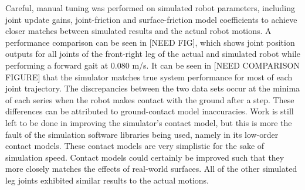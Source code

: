 		Careful, manual tuning was performed on simulated robot parameters, including joint update gains, joint-friction and surface-friction model coefficients to achieve closer matches between simulated results and the actual robot motions. A performance comparison can be seen in [NEED FIG], which shows joint position outputs for all joints of the front-right leg of the actual and simulated robot while performing a forward gait at $0.080$ m/s. It can be seen in [NEED COMPARISON FIGURE] that the simulator matches true system performance for most of each joint trajectory. The discrepancies between the two data sets occur at the minima of each series when the robot makes contact with the ground after a step. These differences can be attributed to ground-contact model inaccuracies. Work is still left to be done in improving the simulator's contact model, but this is more the fault of the simulation software libraries being used, namely in its low-order contact models. These contact models are very simplistic for the sake of simulation speed. Contact models could certainly be improved such that they more closely matches the effects of real-world surfaces. All of the other simulated leg joints exhibited similar results to the actual motions.

